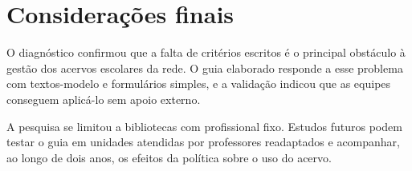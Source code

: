 \chapter{Considerações finais}
\label{cap:consideracoes}


O diagnóstico confirmou que a falta de critérios escritos é o principal obstáculo à gestão dos acervos escolares da rede. O guia elaborado responde a esse problema com textos-modelo e formulários simples, e a validação indicou que as equipes conseguem aplicá-lo sem apoio externo.

A pesquisa se limitou a bibliotecas com profissional fixo. Estudos futuros podem testar o guia em unidades atendidas por professores readaptados e acompanhar, ao longo de dois anos, os efeitos da política sobre o uso do acervo.
